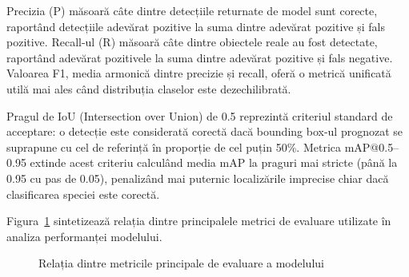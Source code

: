 Precizia (P) măsoară câte dintre detecțiile returnate de model sunt corecte, raportând detecțiile adevărat pozitive la suma dintre adevărat pozitive și fals pozitive. Recall-ul (R) măsoară câte dintre obiectele reale au fost detectate, raportând adevărat pozitivele la suma dintre adevărat pozitive și fals negative. Valoarea F1, media armonică dintre precizie și recall, oferă o metrică unificată utilă mai ales când distribuția claselor este dezechilibrată.

Pragul de IoU (Intersection over Union) de 0.5 reprezintă criteriul standard de acceptare: o detecție este considerată corectă dacă bounding box-ul prognozat se suprapune cu cel de referință în proporție de cel puțin 50\%. Metrica mAP@0.5--0.95 extinde acest criteriu calculând media mAP la praguri mai stricte (până la 0.95 cu pas de 0.05), penalizând mai puternic localizările imprecise chiar dacă clasificarea speciei este corectă.

Figura~\ref{fig:metrici-model} sintetizează relația dintre principalele metrici de evaluare utilizate în analiza performanței modelului.

\begin{figure}[H]
\centering
{}
\caption{Relația dintre metricile principale de evaluare a modelului}
\label{fig:metrici-model}
\end{figure}

